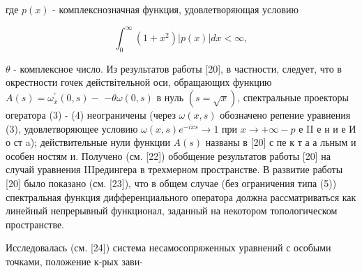 \documentclass[10pt]{article}
\begin{document}
где $p(x)$ - комплекснозначная функция, удовлетворяющая условию



\[

\int_{0}^{\infty}\left(1+x^{2}\right)|p(x)| d x<\infty,

\]



$\theta$ - комплексное число. Из результатов работы [20], в частности, следует, что в окрестности гочек действітельной оси, обращающих функцию $A(s)=\omega_{x}^{\prime}(0, s)-$ $-\theta \omega(0, s)$ в нуль $(s=\sqrt{x})$, спектральные проекторы огератора (3) - (4) неограничены (через $\omega(x, s)$ обозначено репение уравнения (3), удовлетворяющее условию $\omega(x, s) e^{-i x s} \rightarrow 1$ при $x \rightarrow+\infty-p$ е II е н и е И о ст a); действительные нули функции $A(s)$ названы в [20] с пе к т а а льным и особен ностям и. Получено (см. [22]) обобщение результатов работы [20] на случай уравнения IIIредингера в трехмерном пространстве. В развитие работы [20] было показано (см. [23]), что в общем случае (без ограничения типа (5)) спектральная функция дифференциального оператора должна рассматриваться как линейный непрерывный функционал, заданный на некотором топологическом пространстве.



Исследовалась (см. [24]) система несамосопряженных уравнений с особыми точками, положение к-рых зави-
\end{document}
